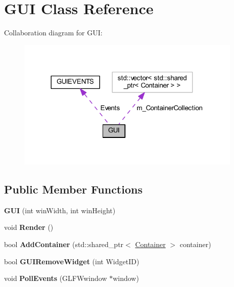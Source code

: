 \hypertarget{class_g_u_i}{}\section{G\+UI Class Reference}
\label{class_g_u_i}


Collaboration diagram for G\+UI\+:
\nopagebreak
\begin{figure}[H]
\begin{center}
\leavevmode
\includegraphics[width=305pt]{class_g_u_i__coll__graph}
\end{center}
\end{figure}
\subsection*{Public Member Functions}
\begin{DoxyCompactItemize}
\item 
{\bfseries G\+UI} (int win\+Width, int win\+Height)\hypertarget{class_g_u_i_a200d23809446a60bf9b9ea4c0ae30c46}{}\label{class_g_u_i_a200d23809446a60bf9b9ea4c0ae30c46}

\item 
void {\bfseries Render} ()\hypertarget{class_g_u_i_a4905ff37be14b83496d098096f5848b6}{}\label{class_g_u_i_a4905ff37be14b83496d098096f5848b6}

\item 
bool {\bfseries Add\+Container} (std\+::shared\+\_\+ptr$<$ \hyperlink{class_container}{Container} $>$ container)\hypertarget{class_g_u_i_a54dfaebb735e37ad855512018039a969}{}\label{class_g_u_i_a54dfaebb735e37ad855512018039a969}

\item 
bool {\bfseries G\+U\+I\+Remove\+Widget} (int Widget\+ID)\hypertarget{class_g_u_i_a6efb59f469126f8629ed5f0acc5138fb}{}\label{class_g_u_i_a6efb59f469126f8629ed5f0acc5138fb}

\item 
void {\bfseries Poll\+Events} (G\+L\+F\+Wwindow $\ast$window)\hypertarget{class_g_u_i_a2afd27aa7203549ebcd97ff4777a683a}{}\label{class_g_u_i_a2afd27aa7203549ebcd97ff4777a683a}

\end{DoxyCompactItemize}
